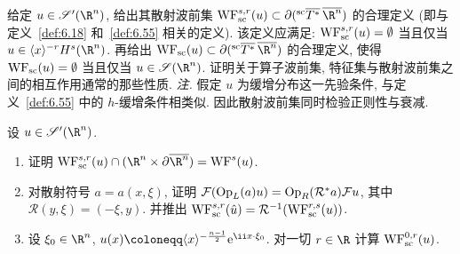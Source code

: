 \begin{exer}[散射波前集, I]\label{ex:6.28}
给定 $u \in \mathscr{S}'(\R^n)$, 给出其散射波前集 $\WF^{s,r}_{\mathrm{sc}}(u) \subset \partial({}^{\mathrm{sc}}\overline{T^*}\,\overline{\R^n})$ 的合理定义 (即与定义~\ref{def:6.18} 和~\ref{def:6.55} 相关的定义). 该定义应满足: $\operatorname{WF}^{s,r}_{\mathrm{sc}}(u) = \emptyset$ 当且仅当 $u \in \langle x \rangle^{-r}H^s(\R^n)$. 再给出 $\WF_{\mathrm{sc}}(u) \subset \partial({}^{\mathrm{sc}}\overline{T^*}\,\overline{\R^n})$ 的合理定义, 使得 $\operatorname{WF}_{\mathrm{sc}}(u) = \emptyset$ 当且仅当 $u \in \mathscr{S}(\R^n)$. 证明关于算子波前集, 特征集与散射波前集之间的相互作用通常的那些性质.
\emph{注.} 假定 $u$ 为缓增分布这一先验条件, 与定义~\ref{def:6.55} 中的 $h$-缓增条件相类似. 因此散射波前集同时检验正则性与衰减.
\end{exer}

\begin{exer}[散射波前集, II]\label{ex:6.29}
设 $u \in \mathscr{S}'(\R^n)$.
\begin{enumerate}
    \item 证明 $\WF^{s,r}_{\mathrm{sc}}(u) \cap (\R^n \times \partial\overline{\R^n}) = \WF^s(u)$.
    \item 对散射符号 $a = a(x, \xi)$, 证明 $\mathcal{F}(\operatorname{Op}_L(a)u) = \operatorname{Op}_R(\mathcal{R}^* a)\mathcal{F}u$, 其中 $\mathcal{R}(y, \xi) = (-\xi, y)$. 并推出 $\operatorname{WF}^{s,r}_{\mathrm{sc}}(\hat{u}) = \mathcal{R}^{-1}(\operatorname{WF}^{r,s}_{\mathrm{sc}}(u))$.
    \item 设 $\xi_0 \in \R^n$, $u(x) \defeq \langle x \rangle^{-\frac{n-1}{2}}\ee^{\ii x \cdot \xi_0}$. 对一切 $r \in \R$ 计算 $\operatorname{WF}^{0,r}_{\mathrm{sc}}(u)$.
\end{enumerate}
\end{exer}


